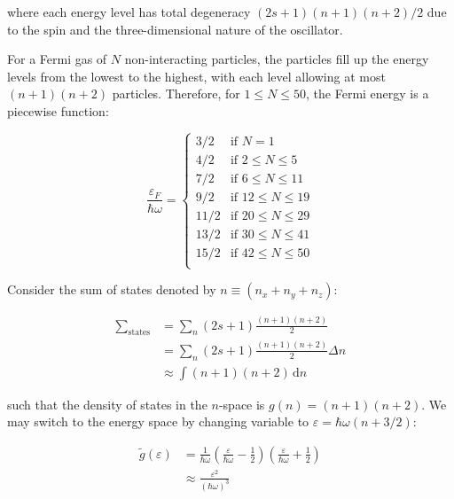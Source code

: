 \documentclass[12pt]{article}
\begin{document}
where each energy level has total degeneracy $(2s + 1)(n + 1)(n + 2)/2$ due to the spin and the three-dimensional nature of the oscillator.

For a Fermi gas of $N$ non-interacting particles, the particles fill up the energy levels from the lowest to the highest, with each level allowing at most $(n + 1)(n + 2)$ particles. Therefore, for $1 \leq N \leq 50$, the Fermi energy is a piecewise function:

\begin{equation}
    \frac{\varepsilon_{F}}{\hbar \omega} = \begin{cases}
        3/2  & \text{if } N = 1             \\
        4/2  & \text{if } 2 \leq N \leq 5   \\
        7/2  & \text{if } 6 \leq N \leq 11  \\
        9/2  & \text{if } 12 \leq N \leq 19 \\
        11/2 & \text{if } 20 \leq N \leq 29 \\
        13/2 & \text{if } 30 \leq N \leq 41 \\
        15/2 & \text{if } 42 \leq N \leq 50 \\
    \end{cases}
\end{equation}

Consider the sum of states denoted by $n \equiv (n_{x} + n_{y} + n_{z})$:

\begin{equation}
    \begin{split}
        \sum_{\text{states}} &= \sum_{n} (2s + 1) \frac{(n + 1)(n + 2)}{2} \\
        &= \sum_{n} (2s + 1) \frac{(n + 1)(n + 2)}{2} \Delta n \\
        &\approx \int (n + 1)(n + 2) \, \mathrm{d}n
    \end{split}
\end{equation}

such that the density of states in the $n$-space is $g(n) = (n + 1)(n + 2)$. We may switch to the energy space by changing variable to $\varepsilon = \hbar \omega (n + 3/2)$:

\begin{equation}
    \begin{split}
        \tilde{g}(\varepsilon) &= \frac{1}{\hbar \omega} \left( \frac{\varepsilon}{\hbar \omega} - \frac{1}{2} \right) \left( \frac{\varepsilon}{\hbar \omega} + \frac{1}{2} \right) \\
        &\approx \frac{\varepsilon^{2}}{(\hbar \omega)^{3}}
    \end{split}
\end{equation}
\end{document}
